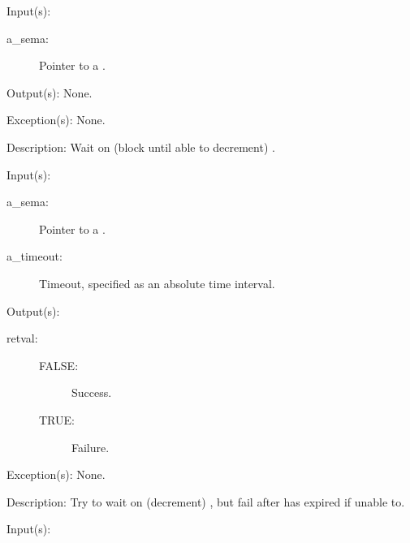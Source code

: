 \begin{capi}
\begin{capilist}
	\end{capilist}
\label{sema_wait}
	\begin{capilist}
	\item[Input(s): ]
		\begin{description}\item[]
		\item[a\_sema: ]
			Pointer to a .
		\end{description}
	\item[Output(s): ] None.
	\item[Exception(s): ] None.
	\item[Description: ]
		Wait on (block until able to decrement) .
	\end{capilist}
\label{sema_timedwait}
	\begin{capilist}
	\item[Input(s): ]
		\begin{description}\item[]
		\item[a\_sema: ]
			Pointer to a \classname{sema}.
		\item[a\_timeout: ]
			Timeout, specified as an absolute time interval.
		\end{description}
	\item[Output(s): ]
		\begin{description}\item[]
		\item[retval: ]
			\begin{description}\item[]
			\item[FALSE: ] Success.
			\item[TRUE: ] Failure.
			\end{description}
		\end{description}
	\item[Exception(s): ] None.
	\item[Description: ]
		Try to wait on (decrement) , but fail after
		 has expired if unable to.
	\end{capilist}
\label{sema_trywait}
	\begin{capilist}
	\item[Input(s): ]

\end{capilist}
\end{capi}
